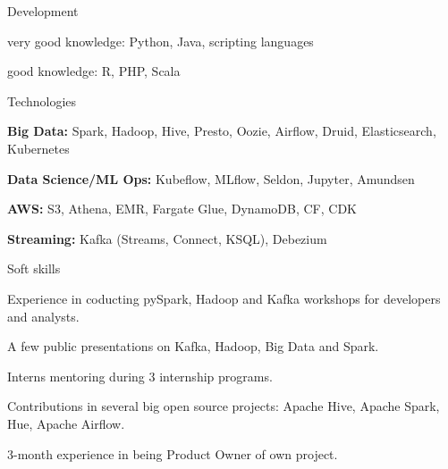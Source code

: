 

\begin{cventries}

  \cventry
    {Development} %
    {} %
    {} %
    {} %
    {
      \begin{cvitems} %
        \item {very good knowledge: Python, Java, scripting languages}
        \item {good knowledge: R, PHP, Scala}
      \end{cvitems}
    }
    
  \cventry
    {Technologies} %
    {} %
    {} %
    {} %
    {
      \begin{cvitems} %
        \item {\textbf{Big Data:} Spark, Hadoop, Hive, Presto, Oozie, Airflow, Druid, Elasticsearch, Kubernetes}
        \item {\textbf{Data Science/ML Ops:} Kubeflow, MLflow, Seldon, Jupyter, Amundsen}
        \item {\textbf{AWS:} S3, Athena, EMR, Fargate Glue, DynamoDB, CF, CDK}
        \item {\textbf{Streaming:} Kafka (Streams, Connect, KSQL), Debezium}
      \end{cvitems}
    }
    
  \cventry
    {Soft skills} %
    {} %
    {} %
    {} %
    {
      \begin{cvitems} %
        \item {Experience in coducting pySpark, Hadoop and Kafka workshops for developers and analysts.}
        \item {A few public presentations on Kafka, Hadoop, Big Data and Spark.}
        \item {Interns mentoring during 3 internship programs.}
        \item {Contributions in several big open source projects: Apache Hive, Apache Spark, Hue, Apache Airflow.}
        \item{3-month experience in being Product Owner of own project.}
      \end{cvitems}
    }
    

\end{cventries}
